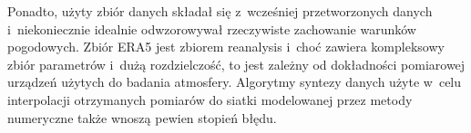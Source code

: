 Ponadto, użyty zbiór danych składał się z~wcześniej przetworzonych danych i~niekoniecznie idealnie
odwzorowywał rzeczywiste zachowanie warunków pogodowych. Zbiór ERA5 jest zbiorem reanalysis i~choć
zawiera kompleksowy zbiór parametrów i~dużą rozdzielczość, to jest zależny od dokładności pomiarowej
urządzeń użytych do badania atmosfery. Algorytmy syntezy danych użyte w~celu interpolacji otrzymanych
pomiarów do siatki modelowanej przez metody numeryczne także wnoszą pewien stopień błędu.

\pagebreak

